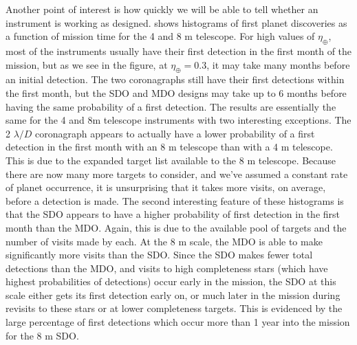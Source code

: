 Another point of interest is how quickly we will be able to tell whether an instrument is working as designed.   shows histograms of first planet discoveries as a function of mission time for the 4 and 8 m telescope.  For high values of $\eta_\oplus$, most of the instruments usually have their first detection in the first month of the mission, but as we see in the figure, at $\eta_\oplus = 0.3$, it may take many months before an initial detection.  The two coronagraphs still have their first detections within the first month, but the SDO and MDO designs may take up to 6 months before having the same probability of a first detection.  The results are essentially the same for the 4 and 8m telescope instruments with two interesting exceptions.  The 2 $\lambda/D$ coronagraph appears to actually have a lower probability of a first detection in the first month with an 8 m telescope than with a 4 m telescope.  This is due to the expanded target list available to the 8 m telescope.  Because there are now many more targets to consider, and we've assumed a constant rate of planet occurrence, it is unsurprising that it takes more visits, on average, before a detection is made.  The second interesting feature of these histograms is that the SDO appears to have a higher probability of first detection in the first month than the MDO.  Again, this is due to the available pool of targets and the number of visits made by each.  At the 8 m scale, the MDO is able to make significantly more visits than the SDO.  Since the SDO makes fewer total detections than the MDO, and visits to high completeness stars (which have highest probabilities of detections) occur early in the mission, the SDO at this scale either gets its first detection early on, or much later in the mission during revisits to these stars or at lower completeness targets.  This is evidenced by the large percentage of first detections which occur more than 1 year into the mission for the 8 m SDO.

